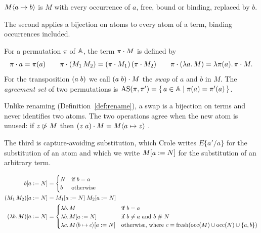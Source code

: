 \begin{definition}[Renaming]
\label{def:rename}
$M\langle a \mapsto b\rangle$ is $M$ with every occurrence of $a$, free, bound or
binding, replaced by $b$.
\end{definition}

The second applies a bijection on atoms to every atom of a term,
binding occurrences included.

\begin{definition}
\label{def:perm-action}
For a permutation $\pi$ of $\mathbb{A}$, the term $\pi \cdot M$ is defined by
\[
  \pi \cdot a = \pi(a)
  \qquad
  \pi \cdot (M_1\, M_2) = (\pi \cdot M_1)\,(\pi \cdot M_2)
  \qquad
  \pi \cdot (\lambda a.\,M) = \lambda \pi(a).\,\pi \cdot M.
\]
For the transposition $(a\;b)$ we call $(a\;b) \cdot M$ the
\emph{swap}
of $a$ and $b$ in $M$. The \emph{agreement set} of two permutations is
$\mathrm{AS}(\pi, \pi') = \{\, a \in \mathbb{A} \mid \pi(a) = \pi'(a) \,\}$.
\end{definition}

Unlike renaming (Definition~\ref{def:rename}), a swap is a bijection
on terms and never identifies two atoms. The two operations agree
when the new atom is unused: if $z \mathrel{\ntriangleright} M$ then
$(z\;a) \cdot M = M\langle a \mapsto z\rangle$
.

The third is capture-avoiding substitution, which Crole writes
$E\{a'/a\}$ for the substitution of an atom and which we write
$M[a \mathrel{{:}{=}} N]$ for the substitution of an arbitrary term.

\begin{definition}
\label{def:subst}
\begin{align*}
  b[a \mathrel{{:}{=}} N] &=
    \begin{cases} N & \text{if } b = a\\ b & \text{otherwise}\end{cases}\\
  (M_1\, M_2)[a \mathrel{{:}{=}} N] &= M_1[a \mathrel{{:}{=}} N]\; M_2[a \mathrel{{:}{=}} N]\\
  (\lambda b.\,M)[a \mathrel{{:}{=}} N] &=
    \begin{cases}
      \lambda b.\,M & \text{if } b = a\\
      \lambda b.\,M[a \mathrel{{:}{=}} N] & \text{if } b \neq a \text{ and } b \mathrel{\#} N\\
      \lambda c.\,M\langle b \mapsto c\rangle[a \mathrel{{:}{=}} N] & \text{otherwise, where }
        c = \mathrm{fresh}(\mathrm{occ}(M) \cup \mathrm{occ}(N) \cup \{a, b\})
    \end{cases}
\end{align*}
\end{definition}

